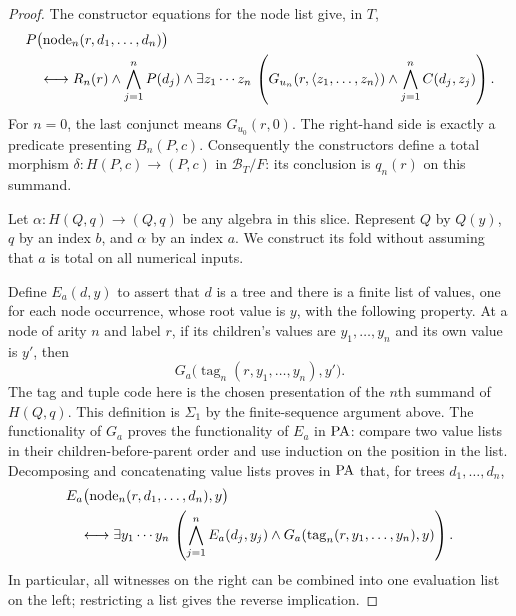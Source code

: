 \begin{proof}
The constructor equations for the node list give, in $T$,
\begin{align}
 &P\bigl(\operatorname{node}_n(r,d_1,\ldots,d_n)\bigr)
                                                        \label{eq:syntactic-derivation-domain}\\
 &\quad\longleftrightarrow
 R_n(r)\land\bigwedge_{j=1}^{n}P(d_j)\land
 \exists z_1\cdots z_n\,
 \left(G_{u_n}(r,\langle z_1,\ldots,z_n\rangle)
       \land\bigwedge_{j=1}^{n}C(d_j,z_j)\right).
 \notag
\end{align}
For $n=0$, the last conjunct means $G_{u_0}(r,0)$.
The right-hand side is exactly a predicate presenting
$B_n(P,c)$.  Consequently the constructors define a total
morphism $\delta:H(P,c)\to(P,c)$ in $\mathcal B_T/F$:
its conclusion is $q_n(r)$ on this summand.

Let $\alpha:H(Q,q)\to(Q,q)$ be any algebra in this slice.
Represent $Q$ by $Q(y)$, $q$ by an index $b$, and $\alpha$ by
an index $a$.  We construct its fold without assuming that
$a$ is total on all numerical inputs.

Define $E_a(d,y)$ to assert that $d$ is a tree and there is a
finite list of values, one for each node occurrence, whose root
value is $y$, with the following property.  At a node of arity
$n$ and label $r$, if its children's values are
$y_1,\ldots,y_n$ and its own value is $y'$, then
\[
 G_a\bigl(\operatorname{tag}_n(r,y_1,\ldots,y_n),y'\bigr).
\]
The tag and tuple code here is the chosen presentation of the
$n$th summand of $H(Q,q)$.  This definition is $\Sigma_1$ by
the finite-sequence argument above.  The functionality of $G_a$
proves the functionality of $E_a$ in $\mathrm{PA}$: compare two value
lists in their children-before-parent order and use induction on
the position in the list.
Decomposing and concatenating value lists proves in $\mathrm{PA}$ that,
for trees $d_1,\ldots,d_n$,
\begin{align}
 &E_a\bigl(\operatorname{node}_n(r,d_1,\ldots,d_n),y\bigr)
                                                        \label{eq:syntactic-derivation-fold}\\
 &\quad\longleftrightarrow
 \exists y_1\cdots y_n\,
 \left(\bigwedge_{j=1}^{n}E_a(d_j,y_j)
       \land G_a(\operatorname{tag}_n(r,y_1,\ldots,y_n),y)
 \right).
 \notag
\end{align}
In particular, all witnesses on the right can be combined into
one evaluation list on the left; restricting a list gives the
reverse implication.


\end{proof}
